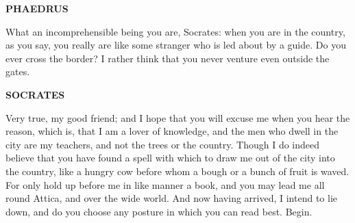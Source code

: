 \documentclass[11pt,letter]{article}
\begin{document}
\par \textbf{PHAEDRUS}
\par   What an incomprehensible being you are, Socrates:  when you are in the country, as you say, you really are like some stranger who is led about by a guide. Do you ever cross the border? I rather think that you never venture even outside the gates.

\par \textbf{SOCRATES}
\par   Very true, my good friend; and I hope that you will excuse me when you hear the reason, which is, that I am a lover of knowledge, and the men who dwell in the city are my teachers, and not the trees or the country. Though I do indeed believe that you have found a spell with which to draw me out of the city into the country, like a hungry cow before whom a bough or a bunch of fruit is waved. For only hold up before me in like manner a book, and you may lead me all round Attica, and over the wide world. And now having arrived, I intend to lie down, and do you choose any posture in which you can read best. Begin.
\end{document}
